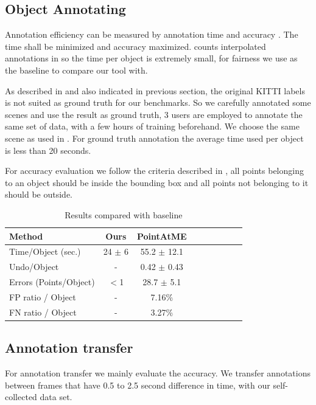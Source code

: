 \documentclass[letterpaper, 10 pt, conference]{ieeeconf}  %
\begin{document}
\subsection{Object Annotating}

Annotation efficiency can be measured by annotation time and accuracy\cite{pointatme} \cite{Zimmer20193DBA}. The time shall be minimized and accuracy maximized. \cite{Zimmer20193DBA} counts interpolated annotations in so the time per object is extremely small, for fairness we use \cite{pointatme} as the baseline to compare our tool with.

As described in \cite{pointatme} and also indicated in previous section, the original KITTI labels is not suited as ground truth for our benchmarks. So we carefully annotated some scenes and use the result as ground truth, 3 users are employed to annotate the same set of data, with a few hours of training beforehand. We choose the same scene as used in \cite{pointatme}. For ground truth annotation the average time used per object is less than 20 seconds.

For accuracy evaluation we follow the criteria  described in \cite{pointatme}, all points belonging to an object should be inside the bounding box and all points not belonging to it should be outside.

\begin{table}[h]
	\centering
	\caption{Results compared with baseline}
	\label{tab:metrics}
	\begin{tabular}{|l|c|c|c|c||c|c|c|c|}
		\hline
		\textbf{Method} & \textbf{Ours} & \textbf{PointAtME\cite{pointatme}} \\
		\hline
		\hline
		Time/Object (sec.) & 24 $\pm$ 6 & 55.2 $\pm$ 12.1\\
		\hline
		Undo/Object & - & 0.42 $\pm$ 0.43\\
		\hline
		Errors (Points/Object) & $<$1 & 28.7 $\pm$ 5.1\\
		\hline
		FP ratio / Object & - & 7.16\%\\
		\hline
		FN ratio / Object & - & 3.27\%\\
		\hline
	\end{tabular}
\end{table}


\subsection{Annotation transfer}
For annotation transfer we mainly evaluate the accuracy. We  transfer annotations between frames that have 0.5 to 2.5 second difference in time, with our self-collected data set.
\end{document}
